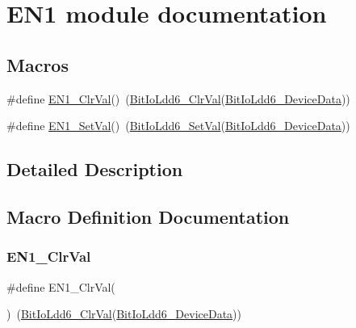 \hypertarget{group___e_n1__module}{}\section{E\+N1 module documentation}
\label{group___e_n1__module}
\subsection*{Macros}
\begin{DoxyCompactItemize}
\item 
\#define \hyperlink{group___e_n1__module_ga0718e5ac4d0e7ab38732c8922621a8fa}{E\+N1\+\_\+\+Clr\+Val}()~(\hyperlink{group___bit_io_ldd6__module_gafd64ff152f22fe76fa77ffb453306285}{Bit\+Io\+Ldd6\+\_\+\+Clr\+Val}(\hyperlink{group___bit_io_ldd6__module_ga7a3520a4a3b9bdfeffab98814fc6a6f2}{Bit\+Io\+Ldd6\+\_\+\+Device\+Data}))
\item 
\#define \hyperlink{group___e_n1__module_ga7ce18b948cb7d929e432e30bf341150f}{E\+N1\+\_\+\+Set\+Val}()~(\hyperlink{group___bit_io_ldd6__module_ga349b97d02eb4a3fd7be6930aa55d08cc}{Bit\+Io\+Ldd6\+\_\+\+Set\+Val}(\hyperlink{group___bit_io_ldd6__module_ga7a3520a4a3b9bdfeffab98814fc6a6f2}{Bit\+Io\+Ldd6\+\_\+\+Device\+Data}))
\end{DoxyCompactItemize}


\subsection{Detailed Description}


\subsection{Macro Definition Documentation}
\mbox{\label{group___e_n1__module_ga0718e5ac4d0e7ab38732c8922621a8fa}} 
\subsubsection{\texorpdfstring{E\+N1\+\_\+\+Clr\+Val}{EN1\_ClrVal}}
{\footnotesize\ttfamily \#define E\+N1\+\_\+\+Clr\+Val(\begin{DoxyParamCaption}{ }\end{DoxyParamCaption})~(\hyperlink{group___bit_io_ldd6__module_gafd64ff152f22fe76fa77ffb453306285}{Bit\+Io\+Ldd6\+\_\+\+Clr\+Val}(\hyperlink{group___bit_io_ldd6__module_ga7a3520a4a3b9bdfeffab98814fc6a6f2}{Bit\+Io\+Ldd6\+\_\+\+Device\+Data}))}

